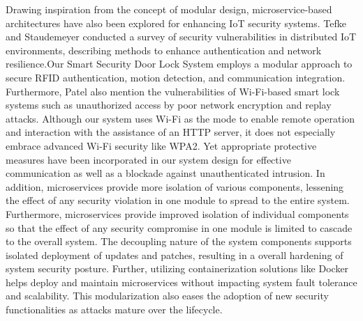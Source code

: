 \documentclass[a4paper]{scrartcl}
\begin{document}
Drawing inspiration from the concept of modular design, microservice-based architectures have also been explored for enhancing IoT security systems. Tefke and Staudemeyer \cite{Tefke2023} conducted a survey of security vulnerabilities in distributed IoT environments, describing methods to enhance authentication and network resilience.Our Smart Security Door Lock System employs a modular approach to secure RFID authentication, motion detection, and communication integration. Furthermore, Patel \cite{Patel2021} also mention the vulnerabilities of Wi-Fi-based smart lock systems such as unauthorized access by poor network encryption and replay attacks. Although our system uses Wi-Fi as the mode to enable remote operation and interaction with the assistance of an HTTP server, it does not especially embrace advanced Wi-Fi security like WPA2. Yet appropriate protective measures have been incorporated in our system design for effective communication as well as a blockade against unauthenticated intrusion. In addition, microservices provide more isolation of various components, lessening the effect of any security violation in one module to spread to the entire system. Furthermore, microservices provide improved isolation of individual components so that the effect of any security compromise in one module is limited to cascade to the overall system. The decoupling nature of the system components supports isolated deployment of updates and patches, resulting in a overall hardening of system security posture. Further, utilizing containerization solutions like Docker helps deploy and maintain microservices without impacting system fault tolerance and scalability. This modularization also eases the adoption of new security functionalities as attacks mature over the lifecycle.
\end{document}

